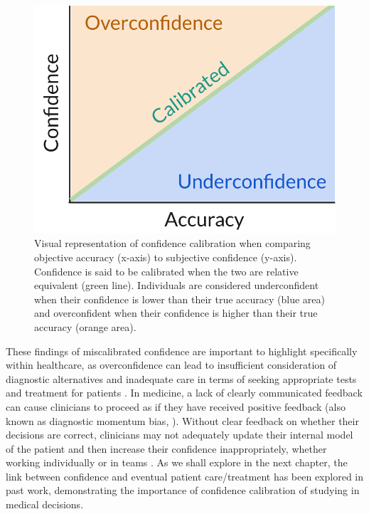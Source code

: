 \documentclass[a4paper, nobind]{templates/ociamthesis}
\begin{document}
\begin{figure}[H]

{\centering \includegraphics[width=1\linewidth]{./assets/confidenceCalibration} 

}

\caption{Visual representation of confidence calibration when comparing objective accuracy (x-axis) to subjective confidence (y-axis). Confidence is said to be calibrated when the two are relative equivalent (green line). Individuals are considered underconfident when their confidence is lower than their true accuracy (blue area) and overconfident when their confidence is higher than their true accuracy (orange area).}\label{fig:calibrationgraph}
\end{figure}

These findings of miscalibrated confidence are important to highlight specifically within healthcare, as overconfidence can lead to insufficient consideration of diagnostic alternatives and inadequate care in terms of seeking appropriate tests and treatment for patients \autocite{kovacs_overconfident_2020}. In medicine, a lack of clearly communicated feedback can cause clinicians to proceed as if they have received positive feedback (also known as diagnostic momentum bias, \textcite{aron_diagnostic_2024}). Without clear feedback on whether their decisions are correct, clinicians may not adequately update their internal model of the patient and then increase their confidence inappropriately, whether working individually or in teams \autocite{jaspan_improving_2022}. As we shall explore in the next chapter, the link between confidence and eventual patient care/treatment has been explored in past work, demonstrating the importance of confidence calibration of studying in medical decisions.
\end{document}
